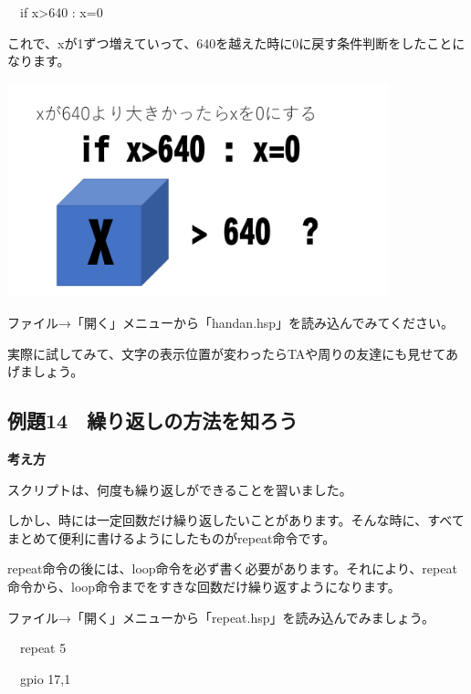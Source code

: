\documentclass[a4paper,12pt]{jarticle}
\begin{document}
\bigskip

\ \ if x{\textgreater}640 : x=0

\bigskip

これで、xが1ずつ増えていって、640を越えた時に0に戻す条件判断をしたことになります。

\bigskip
\bigskip

\begin{minipage}{9.781cm}
\centering
{\upshape
\includegraphics[keepaspectratio,width=11.033cm,height=6.209cm]{text02-img/text02-img052.png}}
\end{minipage}

\bigskip
\bigskip
\bigskip

ファイル→「開く」メニューから「handan.hsp」を読み込んでみてください。

実際に試してみて、文字の表示位置が変わったらTAや周りの友達にも見せてあげましょう。


\clearpage
\subsection{例題14　繰り返しの方法を知ろう}
\bigskip
\bigskip

{\bfseries
考え方}

\bigskip

スクリプトは、何度も繰り返しができることを習いました。

しかし、時には一定回数だけ繰り返したいことがあります。そんな時に、すべてまとめて便利に書けるようにしたものがrepeat命令です。

repeat命令の後には、loop命令を必ず書く必要があります。それにより、repeat命令から、loop命令までをすきな回数だけ繰り返すようになります。

ファイル→「開く」メニューから「repeat.hsp」を読み込んでみましょう。

\bigskip

\ \ repeat 5

\ \ gpio 17,1
\end{document}
